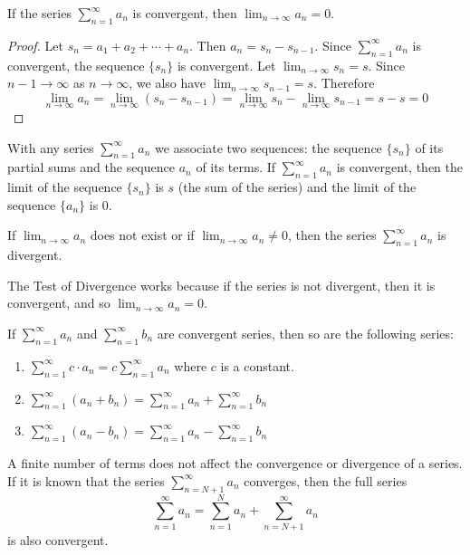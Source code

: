 \begin{theorem}
    If the series \(\displaystyle{\sum_{n=1}^\infty a_n}\) is convergent, then
    \(\displaystyle{\lim_{n\to\infty}a_n=0}\).
\end{theorem}
\begin{proof}
    Let \(s_n=a_1+a_2+\cdots+a_n\).
    Then \(a_n=s_n-s_{n-1}\).
    Since \(\displaystyle{\sum_{n=1}^\infty a_n}\) is convergent, the sequence
    \(\{s_n\}\) is convergent.
    Let \(\displaystyle{\lim_{n\to\infty}s_n=s}\).
    Since \(n-1\to\infty\) as \(n\to\infty\), we also have
    \(\displaystyle{\lim_{n\to\infty}s_{n-1}=s}\).
    Therefore
    \[\lim_{n\to\infty}a_n=\lim_{n\to\infty}(s_n-s_{n-1})
    =\lim_{n\to\infty}s_n-\lim_{n\to\infty}s_{n-1}=s-s=0\]
\end{proof}
With any series \(\displaystyle{\sum_{n=1}^\infty a_n}\) we associate two
sequences: the sequence \(\{s_n\}\) of its partial sums and the sequence
\({a_n}\) of its terms.
If \(\displaystyle{\sum_{n=1}^\infty a_n}\) is convergent, then the limit of
the sequence \(\{s_n\}\) is \(s\) (the sum of the series) and the limit of the
sequence \(\{a_n\}\) is 0.
\begin{theorem}
    If \(\displaystyle{\lim_{n\to\infty}a_n}\) does not exist or if
    \(\displaystyle{\lim_{n\to\infty}a_n\neq 0}\), then the series
    \(\displaystyle{\sum_{n=1}^\infty a_n}\) is divergent.
\end{theorem}
The Test of Divergence works because if the series is not divergent, then it
is convergent, and so \(\displaystyle{\lim_{n\to\infty}a_n=0}\).
\begin{theorem}
    If \(\displaystyle{\sum_{n=1}^\infty a_n}\) and
    \(\displaystyle{\sum_{n=1}^\infty b_n}\) are convergent series, then so
    are the following series:
    \begin{enumerate}
        \item
        \(\displaystyle{\sum_{n=1}^\infty c\cdot a_n
        =c\sum_{n=1}^\infty a_n}\) where \(c\) is a constant.
        \item
        \(\displaystyle{\sum_{n=1}^\infty(a_n+b_n)
        =\sum_{n=1}^\infty a_n+\sum_{n=1}^\infty b_n}\)
        \item
        \(\displaystyle{\sum_{n=1}^\infty(a_n-b_n)
        =\sum_{n=1}^\infty a_n-\sum_{n=1}^\infty b_n}\)
    \end{enumerate}
\end{theorem}
A finite number of terms does not affect the convergence or divergence of a
series.
If it is known that the series \(\displaystyle{\sum_{n=N+1}^\infty}a_n\)
converges, then the full series
\[\sum_{n=1}^\infty a_n=\sum_{n=1}^N a_n+\sum_{n=N+1}^\infty a_n\]
is also convergent.